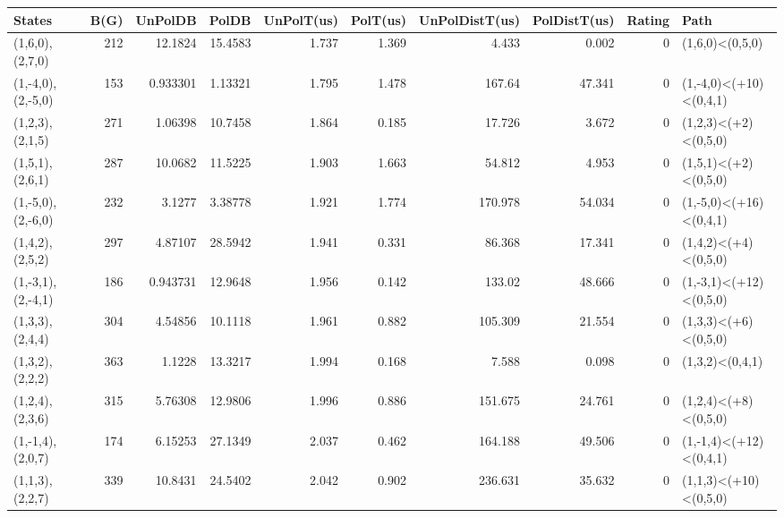 \begin{tabular}{lrrrrrrrrl}
\hline
 States             &   B(G) &    UnPolDB &        PolDB &   UnPolT(us) &   PolT(us) &   UnPolDistT(us) &   PolDistT(us) &   Rating & Path                   \\
\hline
 (1,6,0),(2,7,0)    &    212 &  12.1824   &     15.4583  &        1.737 &      1.369 &            4.433 &          0.002 &        0 & (1,6,0)<(0,5,0)        \\
 (1,-4,0),(2,-5,0)  &    153 &   0.933301 &      1.13321 &        1.795 &      1.478 &          167.64  &         47.341 &        0 & (1,-4,0)<(+10)<(0,4,1) \\
 (1,2,3),(2,1,5)    &    271 &   1.06398  &     10.7458  &        1.864 &      0.185 &           17.726 &          3.672 &        0 & (1,2,3)<(+2)<(0,5,0)   \\
 (1,5,1),(2,6,1)    &    287 &  10.0682   &     11.5225  &        1.903 &      1.663 &           54.812 &          4.953 &        0 & (1,5,1)<(+2)<(0,5,0)   \\
 (1,-5,0),(2,-6,0)  &    232 &   3.1277   &      3.38778 &        1.921 &      1.774 &          170.978 &         54.034 &        0 & (1,-5,0)<(+16)<(0,4,1) \\
 (1,4,2),(2,5,2)    &    297 &   4.87107  &     28.5942  &        1.941 &      0.331 &           86.368 &         17.341 &        0 & (1,4,2)<(+4)<(0,5,0)   \\
 (1,-3,1),(2,-4,1)  &    186 &   0.943731 &     12.9648  &        1.956 &      0.142 &          133.02  &         48.666 &        0 & (1,-3,1)<(+12)<(0,5,0) \\
 (1,3,3),(2,4,4)    &    304 &   4.54856  &     10.1118  &        1.961 &      0.882 &          105.309 &         21.554 &        0 & (1,3,3)<(+6)<(0,5,0)   \\
 (1,3,2),(2,2,2)    &    363 &   1.1228   &     13.3217  &        1.994 &      0.168 &            7.588 &          0.098 &        0 & (1,3,2)<(0,4,1)        \\
 (1,2,4),(2,3,6)    &    315 &   5.76308  &     12.9806  &        1.996 &      0.886 &          151.675 &         24.761 &        0 & (1,2,4)<(+8)<(0,5,0)   \\
 (1,-1,4),(2,0,7)   &    174 &   6.15253  &     27.1349  &        2.037 &      0.462 &          164.188 &         49.506 &        0 & (1,-1,4)<(+12)<(0,4,1) \\
 (1,1,3),(2,2,7)    &    339 &  10.8431   &     24.5402  &        2.042 &      0.902 &          236.631 &         35.632 &        0 & (1,1,3)<(+10)<(0,5,0)  \\

\end{tabular}
